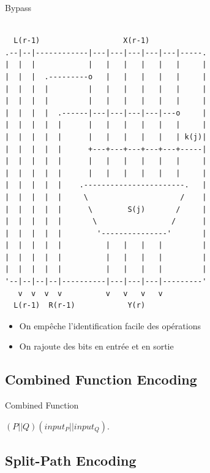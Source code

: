 \documentclass{beamer}
\begin{document}
\begin{frame}{Bypass}

\begin{Verbatim}[samepage=true]

  L(r-1)                   X(r-1)
.--|--|------------|---|---|---|---|---|-----.
|  |  |            |   |   |   |   |   |     |
|  |  |  .---------o   |   |   |   |   |     |
|  |  |  |         |   |   |   |   |   |     |   
|  |  |  |         |   |   |   |   |   |     |  
|  |  |  |  .------|---|---|---|---|---o     | 
|  |  |  |  |      |   |   |   |   |   |     | 
|  |  |  |  |      |   |   |   |   |   | k(j)|  
|  |  |  |  |      +---+---+---+---+---+-----|  
|  |  |  |  |      |   |   |   |   |   |     | 
|  |  |  |  |      |   |   |   |   |   |     | 
|  |  |  |  |    .-----------------------.   |              
|  |  |  |  |     \                     /    |              
|  |  |  |  |      \        S(j)       /     |              
|  |  |  |  |       \                 /      |               
|  |  |  |  |        '---------------'       |               
|  |  |  |  |          |   |   |   |         |     
|  |  |  |  |          |   |   |   |         | 
|  |  |  |  |          |   |   |   |         |   
'--|--|--|--|----------|---|---|---|---------'
   v  v  v  v          v   v   v   v 
  L(r-1)  R(r-1)            Y(r)

\end{Verbatim}	

  \begin{itemize}
  \item On empêche l'identification facile des opérations
  \item On rajoute des bits en entrée et en sortie
  \end{itemize}

\end{frame}


\subsection{Combined Function Encoding}

\begin{frame}{Combined Function}
  \begin{center}
    $(P||Q)(input_P||input_Q)$.
  \end{center}
\end{frame}

\subsection{Split-Path Encoding}
\end{document}
